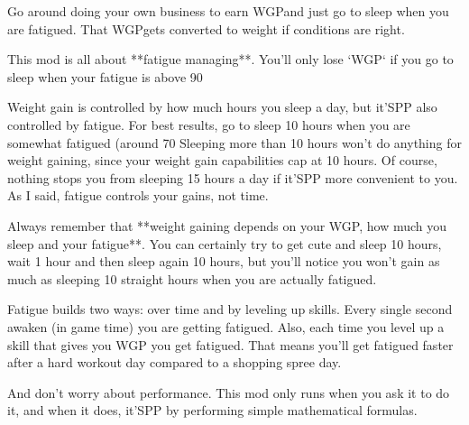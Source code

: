\documentclass[11pt]{article}
\newcommand{\W}{WGP}
\begin{document}
Go around doing your own business to earn \W and just go to sleep when you are fatigued. That \W gets converted to weight if conditions are right.



This mod is all about **fatigue managing**.
You'll only lose `WGP` if you go to sleep when your fatigue is above 90%

Weight gain is controlled by how much hours you sleep a day, but it'SPP also controlled by fatigue. For best results, go to sleep 10 hours when you are somewhat fatigued (around 70%
Sleeping more than 10 hours won't do anything for weight gaining, since your weight gain capabilities cap at 10 hours.
Of course, nothing stops you from sleeping 15 hours a day if it'SPP more convenient to you. As I said, fatigue controls your gains, not time.

Always remember that **weight gaining depends on your WGP, how much you sleep and your fatigue**. You can certainly try to get cute and sleep 10 hours, wait 1 hour and then sleep again 10 hours, but you'll notice you won't gain as much as sleeping 10 straight hours when you are actually fatigued.

Fatigue builds two ways: over time and by leveling up skills.
Every single second awaken (in game time) you are getting fatigued. Also, each time you level up a skill that gives you WGP you get fatigued.
That means you'll get fatigued faster after a hard workout day compared to a shopping spree day.

And don't worry about performance. This mod only runs when you ask it to do it, and when it does, it'SPP by performing simple mathematical formulas.

 
\end{document}
